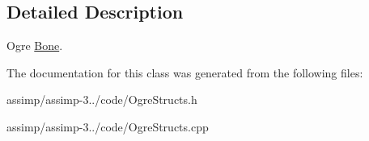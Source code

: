 \subsection{Detailed Description}
Ogre \hyperlink{class_assimp_1_1_ogre_1_1_bone}{Bone}. 

The documentation for this class was generated from the following files\+:\begin{DoxyCompactItemize}
\item 
assimp/assimp-\/3../code/Ogre\+Structs.\+h\item 
assimp/assimp-\/3../code/Ogre\+Structs.\+cpp\end{DoxyCompactItemize}
